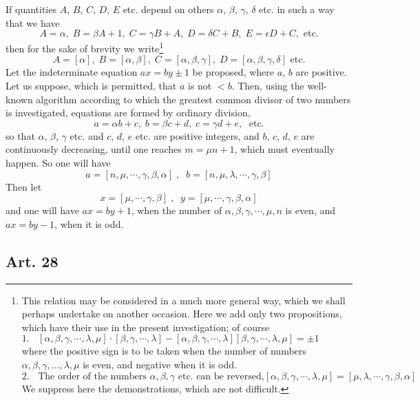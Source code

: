 \documentclass{book}
\theoremstyle{plain}
\theoremstyle{remark}
\begin{document}
If quantities $A$, $B$, $C$, $D$, $E$ etc. depend on others $\alpha$, $\beta$, $\gamma$, $\delta$ etc. in such a way that we have 
\[ A = \alpha, \; B = \beta A + 1 , \; C = \gamma B + A, \; D = \delta C + B, \; E = \epsilon D + C, \textrm{ etc.} \]
then for the sake of brevity we write\footnote{This relation may be considered in a much more general way, which we shall perhaps undertake on another occasion.   Here we add only two propositions, which have their use in the present investigation; of course 
\[ \textrm{1.  } \;\; [\alpha,\beta,\gamma, \cdots, \lambda, \mu] \cdot [ \beta, \gamma, \cdots, \lambda] - [\alpha, \beta, \gamma, \cdots, \lambda] [\beta, \gamma, \cdots, \lambda, \mu] = \pm 1 \; \; \; \; \; \; \; \; \; \; \; \;\;\;\;\;\;\;\;\;\;\;\;\;\;\;\;\;\;\;\;\;\;\;\; \;\;\]
where the positive sign is to be taken when the number of numbers $\alpha,\beta,\gamma,\dots,\lambda,\mu$ is even, and negative when it is odd. 
\[ \textrm{2.  } \;\; \textrm{The order of the numbers }\alpha, \beta, \gamma\textrm{ etc. can be reversed,}  [\alpha,\beta,\gamma, \cdots, \lambda, \mu] = [\mu, \lambda, \cdots, \gamma, \beta, \alpha] \]
We suppress here the demonstrations, which are not difficult.
} 
\[ A = [\alpha], \; B = [\alpha,\beta], \; C = [\alpha, \beta, \gamma], \; D = [\alpha, \beta, \gamma, \delta] \textrm{ etc.} \]
Let the indeterminate equation $ax=by\pm1$ be proposed, where $a$, $b$ are positive.  Let us suppose, which is permitted, that $a$ is not $< b$.  Then, using the well-known algorithm according to which the greatest common divisor of two numbers is investigated, equations are formed by ordinary division,
\[ a = \alpha b + c, \; b = \beta c + d, \; c = \gamma d + e, \; \textrm{ etc.} \]
so that $\alpha$, $\beta$, $\gamma$ etc. and $c$, $d$, $e$ etc. are positive integers, and $b$, $c$, $d$, $e$ are continuously decreasing, until one reaches $m = \mu n + 1$, which must eventually happen.  So one will have
\[ a = [n,\mu, \cdots, \gamma, \beta, \alpha] \; , \; \; b = [n,\mu,\lambda, \cdots, \gamma,\beta] \]
Then let
\[ x = [\mu, \cdots, \gamma, \beta] \;, \; \; y = [\mu,\cdots,\gamma,\beta,\alpha] \]
and one will have $ax= by +1$, when the number of $\alpha, \beta, \gamma, \cdots, \mu, n$ is even, and $ax=by-1$, when it is odd.

\subsection*{Art. 28}
\end{document}
